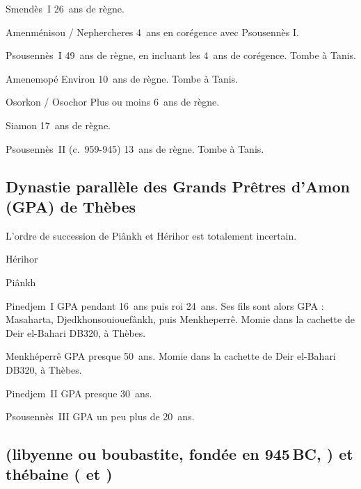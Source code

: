 \begin{listerois}
  \item [Smendès~I\ier] \num{26}~ans de règne.
  \item [Amenménisou / Nephercheres] \num{4}~ans en corégence avec 
        Psousennès I\ier.
  \item [Psousennès~I\ier] \num{49}~ans de règne, en incluant les 
        \num{4}~ans de corégence. Tombe à Tanis.
  \item [Amenemopé \datation{(c.~993-984)}] 
        Environ \num{10}~ans de règne. 
        Tombe à Tanis.
  \item [Osorkon / Osochor] Plus ou moins \num{6}~ans de règne.
  \item [Siamon] \num{17}~ans de règne.
  \item [Psousennès~II] (c.~959-945) \num{13}~ans de règne. 
        Tombe à Tanis.
\end{listerois}

\subsection[Dynastie des GPA de Thèbes]{Dynastie parallèle des Grands 
            Prêtres d'Amon (GPA) de Thèbes}

L'ordre de succession de Piânkh et Hérihor est totalement incertain.

\begin{listerois}
  \item [Hérihor]
  \item [Piânkh]
  \item [Pinedjem~I\ier \datation{(c.~1070-1032)}] 
        GPA pendant \num{16}~ans puis roi \num{24}~ans. Ses fils sont 
        alors GPA : Masaharta, Djedkhonsouiouefânkh, puis Menkheperrê.
        Momie dans la cachette de Deir el-Bahari DB320, à Thèbes.
  \item [Menkhéperrê \datation{(c.~1045-992)}] 
        GPA presque \num{50}~ans.
        Momie dans la cachette de Deir el-Bahari DB320, à Thèbes.
  \item [Pinedjem~II] GPA presque \num{30}~ans.
  \item [Psousennès~III] GPA un peu plus de \num{20}~ans.

\end{listerois}

\subsection[\texorpdfstring{\dyn{xxii} et \dyn{xxiii}s}
                           {XXIIe et XXIIIe dynasties}]
           { (libyenne ou boubastite, fondée en 945\,BC, 
            \XIIA) et  \og thébaine \fg (\XIIB{} et \XIIC)}

